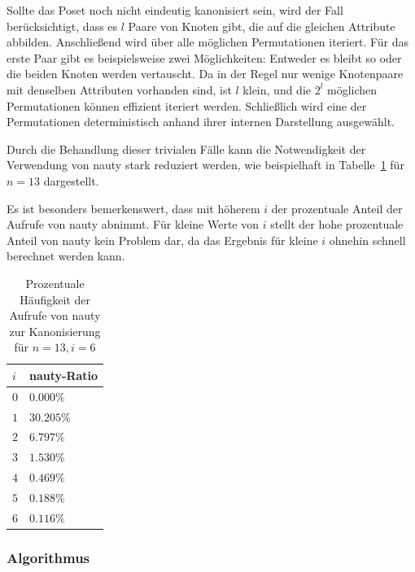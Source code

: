 \documentclass[10pt,journal,compsoc]{IEEEtran}
\begin{document}
Sollte das Poset noch nicht eindeutig kanonisiert sein, wird der Fall berücksichtigt, dass es $l$ Paare von Knoten gibt, die auf die gleichen Attribute abbilden.
Anschließend wird über alle möglichen Permutationen iteriert.
Für das erste Paar gibt es beispielsweise zwei Möglichkeiten: Entweder es bleibt so oder die beiden Knoten werden vertauscht.
Da in der Regel nur wenige Knotenpaare mit denselben Attributen vorhanden sind, ist $l$ klein, und die $2^l$ möglichen Permutationen können effizient iteriert werden. Schließlich wird eine der Permutationen deterministisch anhand ihrer internen Darstellung ausgewählt.

Durch die Behandlung dieser trivialen Fälle kann die Notwendigkeit der Verwendung von nauty stark reduziert werden, wie beispielhaft in Tabelle~\ref{table:nauty-ratio} für $n = 13$ dargestellt.

Es ist besonders bemerkenswert, dass mit höherem $i$ der prozentuale Anteil der Aufrufe von nauty abnimmt.
Für kleine Werte von $i$ stellt der hohe prozentuale Anteil von nauty kein Problem dar, da das Ergebnis für kleine $i$ ohnehin schnell berechnet werden kann.

\begin{table}
  \begin{tabular}{l|l}
    $i$ & nauty-Ratio \\
    \hline
    $0$ & $0.000\%$   \\
    $1$ & $30.205\%$  \\
    $2$ & $6.797\%$   \\
    $3$ & $1.530\%$   \\
    $4$ & $0.469\%$   \\
    $5$ & $0.188\%$   \\
    $6$ & $0.116\%$
  \end{tabular}
  \centering
  \caption{Prozentuale Häufigkeit der Aufrufe von nauty zur Kanonisierung für $n = 13, i = 6$}
  \label{table:nauty-ratio}
\end{table}

\subsubsection{Algorithmus} \label{sec:backward:algorithm}
\end{document}
